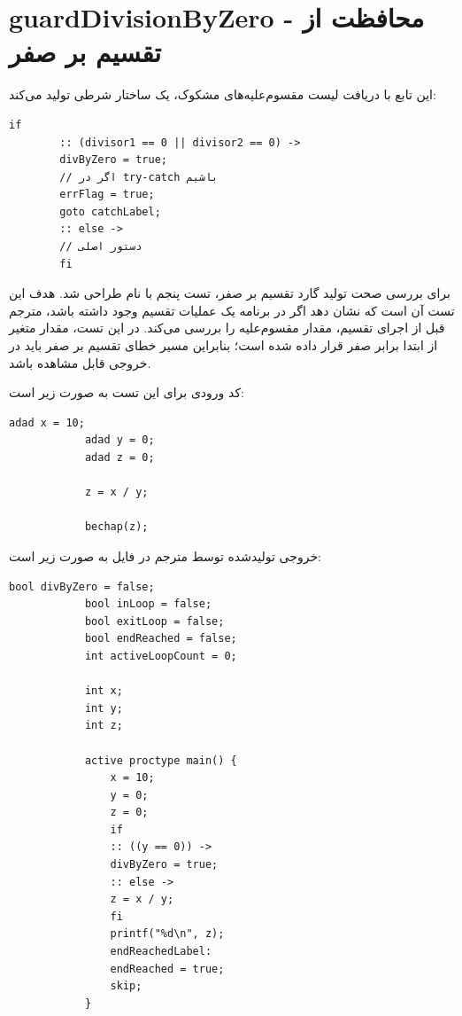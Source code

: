 \documentclass[12pt]{report}
\begin{document}
	\section{guardDivisionByZero - محافظت از تقسیم بر صفر}
	
	این تابع با دریافت لیست مقسوم‌علیه‌های مشکوک، یک ساختار شرطی تولید می‌کند:
	
	\setLTR
	\begin{lstlisting}[language=Promela]
		if
		:: (divisor1 == 0 || divisor2 == 0) ->
		divByZero = true;
		// اگر در try-catch باشیم
		errFlag = true;
		goto catchLabel;
		:: else ->
		// دستور اصلی
		fi
	\end{lstlisting}
	\setRTL
	
	برای بررسی صحت تولید گارد تقسیم بر صفر، تست پنجم با نام  طراحی شد. 
	هدف این تست آن است که نشان دهد اگر در برنامه  یک عملیات تقسیم وجود داشته باشد، مترجم قبل از اجرای تقسیم، مقدار مقسوم‌علیه را بررسی می‌کند. 
	در این تست، مقدار متغیر  از ابتدا برابر صفر قرار داده شده است؛ بنابراین مسیر خطای تقسیم بر صفر باید در خروجی  قابل مشاهده باشد.
	
	
	کد ورودی  برای این تست به صورت زیر است:
	
	\begin{latin}
		\begin{lstlisting}[style=hashstyle]
			adad x = 10;
			adad y = 0;
			adad z = 0;
			
			z = x / y;
			
			bechap(z);
		\end{lstlisting}
	\end{latin}
	
	خروجی تولیدشده توسط مترجم در فایل  به صورت زیر است:
	
	\begin{latin}
		\begin{lstlisting}[style=codestyle]
			bool divByZero = false;
			bool inLoop = false;
			bool exitLoop = false;
			bool endReached = false;
			int activeLoopCount = 0;
			
			int x;
			int y;
			int z;
			
			active proctype main() {
				x = 10;
				y = 0;
				z = 0;
				if
				:: ((y == 0)) ->
				divByZero = true;
				:: else ->
				z = x / y;
				fi
				printf("%d\n", z);
				endReachedLabel:
				endReached = true;
				skip;
			}
		\end{lstlisting}
	\end{latin}
	
\end{document}
